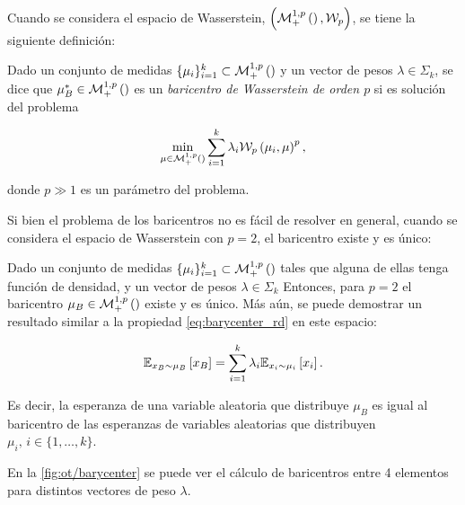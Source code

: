 Cuando se considera el espacio de Wasserstein, $\left(\mathcal{M}_+^{1,p}\left(\right),\mathcal{W}_p\right)$, se tiene la siguiente definición:

\begin{defn}
	Dado un conjunto de medidas $\{\mu_i\}_{i=1}^k\subset\mathcal{M}_+^{1,p}\left(\right)$ y un vector de pesos $\lambda\in\Sigma_k$, se dice que $\mu_B^*\in\mathcal{M}_+^{1,p}\left(\right)$ es un \textit{baricentro de Wasserstein de orden $p$} si es solución del problema

	\begin{equation*}
		\min_{\mu\in\mathcal{M}_+^{1,p}\left(\right)} \sum_{i=1}^k \lambda_i \mathcal{W}_{p}\left(\mu_i,\mu\right)^p ,
	\end{equation*}

	donde $p\gg 1$ es un parámetro del problema.

\end{defn}

Si bien el problema de los baricentros no es fácil de resolver en general, cuando se considera el espacio de Wasserstein con $p=2$, el baricentro existe y es único:

\begin{prop}
	Dado un conjunto de medidas $\{\mu_i\}_{i=1}^k\subset\mathcal{M}_+^{1,p}\left(\right)$ tales que alguna de ellas tenga función de densidad, y un vector de pesos $\lambda\in\Sigma_k$ Entonces, para $p=2$ el baricentro $\mu_B\in\mathcal{M}_+^{1,p}\left(\right)$ existe y es único. Más aún, se puede demostrar un resultado similar a la propiedad \eqref{eq:barycenter_rd} en este espacio:

\begin{equation*}
	\mathbb{E}_{x_B\sim\mu_B}\left[x_B\right] = \sum_{i=1}^k \lambda_i \mathbb{E}_{x_i\sim\mu_i}\left[x_i\right] .
\end{equation*}

	Es decir, la esperanza de una variable aleatoria que distribuye $\mu_B$ es igual al baricentro de las esperanzas de variables aleatorias que distribuyen $\mu_i,\, i\in\{1,\ldots,k\}$.
\end{prop}

En la \autoref{fig:ot/barycenter} se puede ver el cálculo de baricentros entre 4 elementos para distintos vectores de peso $\lambda$.


